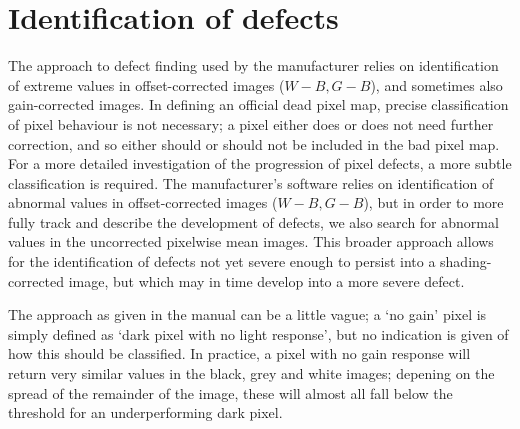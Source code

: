 \documentclass[\main/IO-Pixels.tex]{subfiles}
\begin{document}
\section{Identification of defects}


The approach to defect finding used by the manufacturer relies on identification of extreme values in offset-corrected images ($W-B, G-B$), and sometimes also gain-corrected images. In defining an official dead pixel map, precise classification of pixel behaviour is not necessary;  a pixel either does or does not need further correction, and so either should or should not be included in the bad pixel map. For a more detailed investigation of the progression of pixel defects, a more subtle classification is required. The manufacturer's software relies on identification of abnormal values in offset-corrected images ($W-B, G-B$), but in order to more fully track and describe the development of defects, we also search for abnormal values in the uncorrected pixelwise mean images. This broader approach allows for the identification of defects not yet severe enough to persist into a shading-corrected image, but which may in time develop into a more severe defect.

The approach as given in the manual can be a little vague; a `no gain' pixel is simply defined as `dark pixel with no light response', but no indication is given of how this should be classified. In practice, a pixel with no gain response will return very similar values in the black, grey and white images; depening on the spread of the remainder of the image, these will almost all fall below the threshold for an underperforming dark pixel.  

\end{document}
